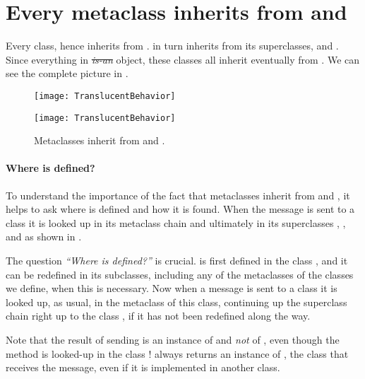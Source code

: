 \documentclass[a4paper,10pt,twoside]{book}
\begin{document}
\section{Every metaclass inherits from  and }

Every   class, hence inherits from .
 in turn inherits from its superclasses,  and .
Since everything in \st \emph{is-an} object, these classes all inherit eventually from .
We can see the complete picture in .

\begin{center}
\begin{figure}
\ifluluelse
	{\centerline{\texttt{[image: TranslucentBehavior]}}}
	{\centerline{\texttt{[image: TranslucentBehavior]}}}
\caption{Metaclasses inherit from  and .\label{fig:inheritbehavior}}
\end{figure}
\end{center}

\paragraph{Where is  defined?}
To understand the importance of the fact that metaclasses inherit from  and , it helps to ask where  is defined and how it is found.
When the message  is sent to a class it is looked up in its metaclass chain and ultimately in its superclasses , , and  as shown in .

The question \emph{``Where  is defined?''} is crucial.
 is first defined in the class , and it can be redefined in its subclasses, including any of the metaclasses of the classes we define, when this is necessary.
Now when a message  is sent to a class it is looked up, as usual, in the metaclass of this class, continuing up the superclass chain right up to the class , if it has not been redefined along the way.

Note that the result of sending  is an instance of  and \emph{not} of , even though the method is looked-up in the class !
 always returns an instance of \self, the class that receives the message, even if it is implemented in another class.
\end{document}
